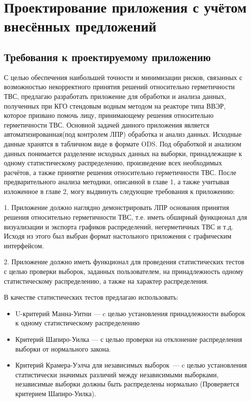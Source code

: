 
\section{Проектирование приложения с учётом внесённых предложений}

\subsection{Требования к проектируемому приложению}\label{trebovaniya}

С целью обеспечения наибольшей точности и минимизации рисков,
связанных с возможностью некорректного принятия решений относительно
герметичности ТВС, предлагаю разработать приложение для обработки и анализа данных, полученных при КГО стендовым водным методом на реакторе типа ВВЭР, которое призвано помочь лицу, принимающему решения относительно
герметичности ТВС. Основной задачей данного приложения является автоматизированная(под контролем ЛПР) обработка и анализ данных. Исходные данные хранятся в табличном виде в формате ODS. Под обработкой и анализом данных понимается разделение исходных данных на выборки, принадлежащие к
одному статистическому распределению, произведение всех необходимых
расчётов, а также принятие решения относительно герметичности ТВС. После предварительного анализа методики, описанной в главе 1, а также учитывая изложенное в главе 2, могу выдвинуть следующие требования к приложению:

1. Приложение должно наглядно демонстрировать ЛПР основания принятия
решения относительно герметичности ТВС, т.е. иметь обширный функционал
для визуализации и экспорта графиков распределений, негерметичных ТВС и т.д. Исходя из этого был выбран формат настольного приложения с графическим интерфейсом.

2. Приложение должно иметь функционал для проведения статистических тестов с целью проверки выборок, заданных пользователем, на принадлежность одному статистическому распределению, а также на характер распределения.

В качестве статистических тестов предлагаю использовать:
\begin{itemize}
	\item U-критерий Манна-Уитни --- c целью установления принадлежности выборок к одному статистическому распределению
	\item Критерий Шапиро-Уилка --- с целью проверки на отклонение распределения выборки от нормального закона.
	\item Критерий Крамера-Уэлча для независимых выборок~--- c целью установления статистически значимых различий между независимыми выборками, независимые выборки должны быть распределены нормально (Проверяется критерием Шапиро-Уилка).
\end{itemize}

